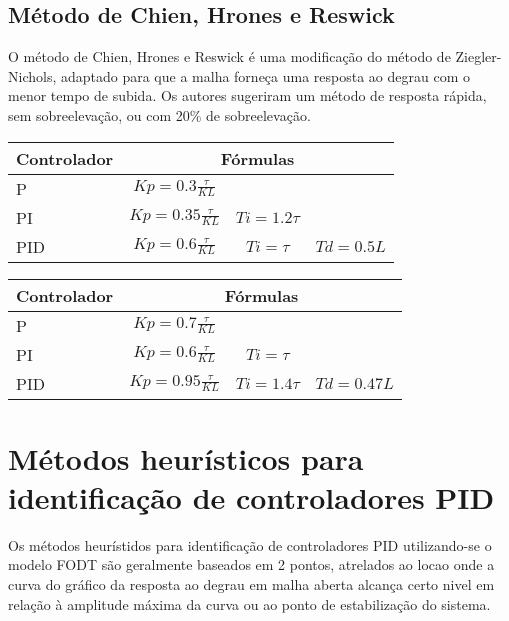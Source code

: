     \subsection{Método de Chien, Hrones e Reswick}
        
        O método de Chien, Hrones e Reswick é uma modificação do método
        de Ziegler-Nichols, adaptado para que a malha forneça uma resposta ao
        degrau com o menor tempo de subida. Os autores sugeriram um método
        de resposta rápida, sem sobreelevação, ou com 20\% de sobreelevação.
        
        \begin{center}
            \begin{tabular}{l*{3}{c}}
Controlador & \multicolumn{3}{c}{Fórmulas} \\
\hline
P   & $Kp = 0.3\frac{\tau}{KL}$     &              & \\
PI  & $Kp = 0.35\frac{\tau}{KL}$ & $Ti = 1.2\tau$ & \\
PID & $Kp = 0.6\frac{\tau}{KL}$ & $Ti = \tau$ & $Td = 0.5L$ \\
            \end{tabular}
        \end{center}

        \newpage

        \begin{center}
            \begin{tabular}{l*{3}{c}}
Controlador & \multicolumn{3}{c}{Fórmulas} \\
\hline
P   & $Kp = 0.7\frac{\tau}{KL}$     &              & \\
PI  & $Kp = 0.6\frac{\tau}{KL}$ & $Ti = \tau$ & \\
PID & $Kp = 0.95\frac{\tau}{KL}$ & $Ti = 1.4\tau$ & $Td = 0.47L$ \\
            \end{tabular}
        \end{center}


\section{Métodos heurísticos para identificação de controladores PID}

    Os métodos heurístidos para identificação de controladores \acs{PID}
    utilizando-se o modelo \acs{FODT} são geralmente baseados em 2 pontos,
    atrelados ao locao onde a curva do gráfico da resposta ao degrau em
    malha aberta alcança certo nivel em relação à amplitude máxima da curva
    ou ao ponto de estabilização do sistema.
    
